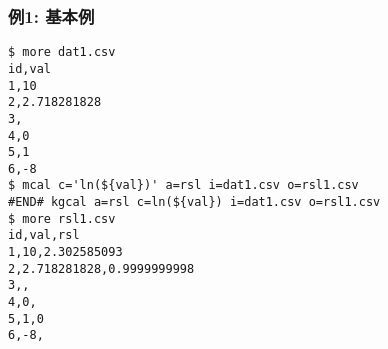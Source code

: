 \subsubsection*{例1: 基本例}



\begin{Verbatim}[baselinestretch=0.7,frame=single]
$ more dat1.csv
id,val
1,10
2,2.718281828
3,
4,0
5,1
6,-8
$ mcal c='ln(${val})' a=rsl i=dat1.csv o=rsl1.csv
#END# kgcal a=rsl c=ln(${val}) i=dat1.csv o=rsl1.csv
$ more rsl1.csv
id,val,rsl
1,10,2.302585093
2,2.718281828,0.9999999998
3,,
4,0,
5,1,0
6,-8,
\end{Verbatim}
